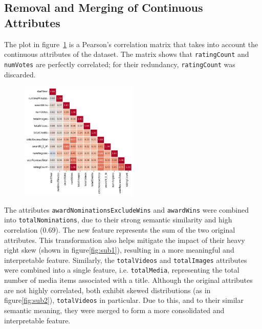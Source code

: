 \subsection{Removal and Merging of Continuous Attributes}\label{sec:var_elim_creation}
The plot in figure~\ref{fig:correlation_matrix} is a Pearson's correlation matrix that takes into
account the continuous attributes of the dataset.
The matrix shows that \texttt{ratingCount} and \texttt{numVotes} are perfectly correlated;
for their redundancy, \texttt{ratingCount} was discarded.\\
\begin{figure}[H]
    \centering
    \includegraphics[width=0.50\textwidth]{plots/correlation_matrix.png}
    \label{fig:correlation_matrix}
\end{figure}

The attributes \texttt{awardNominationsExcludeWins} and \texttt{awardWins} were combined into 
\texttt{totalNominations}, due to their strong semantic similarity and high correlation (0.69).
The new feature represents the sum of the two original attributes. This transformation also helps
mitigate the impact of their heavy right skew (shown in figure\ref{fig:sub1}), resulting in a more meaningful and interpretable feature.
Similarly, the \texttt{totalVideos} and \texttt{totalImages} attributes were combined into a single
feature, i.e. \texttt{totalMedia}, representing the total number of media items associated with a title.
Although the original attributes are not highly correlated, both exhibit skewed distributions (as in figure\ref{fig:sub2}), \texttt{totalVideos} in particular.
Due to this, and to their similar semantic meaning, they were merged to form a more consolidated and
interpretable feature.

